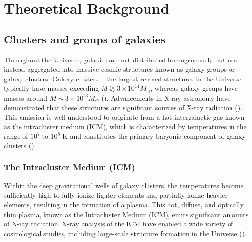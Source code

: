 
\chapter{Theoretical Background}
\label{sec:theoretical_background}
\section{Clusters and groups of galaxies}
Throughout the Universe, galaxies are not distributed homogeneously but are instead aggregated into massive cosmic structures known as galaxy groups or galaxy clusters. Galaxy clusters -- the largest relaxed structures in the Universe -- typically have masses exceeding \(M \gtrsim 3 \times 10^{14} M_{\odot}\), whereas galaxy groups have masses around \(M \sim 3 \times 10^{13} M_{\odot}\) (\cite{Schneider_2006}). Advancements in X-ray astronomy have demonstrated that these structures are significant sources of X-ray radiation (\cite{Cavaliere_1971}). This emission is well understood to originate from a hot intergalactic gas known as the intracluster medium (ICM), which is characterized by temperatures in the range of \(10^7\) to \(10^8\) K and constitutes the primary baryonic component of galaxy clusters (\cite{Schneider_2006}).
%
\subsection{The Intracluster Medium (ICM)}
Within the deep gravitational wells of galaxy clusters, the temperatures become sufficiently high to fully ionize lighter elements and partially ionize heavier elements, resulting in the formation of a plasma. This hot, diffuse, and optically thin plasma, known as the Intracluster Medium (ICM), emits significant amounts of X-ray radiation. X-ray analysis of the ICM have enabled a wide variety of cosmological studies, including large-scale structure formation in the Universe (\cite{KravtsovBorgani2012}).
%
